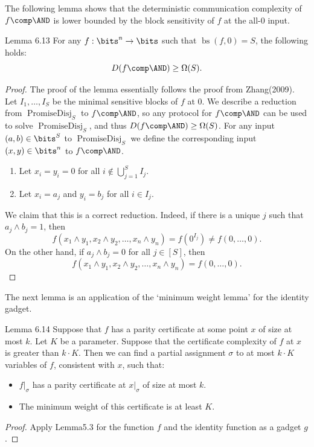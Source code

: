 The following lemma shows that the deterministic communication complexity of $f\comp\AND$ is lower bounded by the block sensitivity of $f$ at the all-0 input.
\begin{originalresult}{Lemma 6.13}
For any $f:\bits^n\to\bits$ such that $\operatorname{bs}(f,0)=S$, the following holds:
\[D(f\comp\AND)\ge\Omega(S).\]
\end{originalresult}
\begin{proof}
The proof of the lemma essentially follows the proof from Zhang(2009). Let $I_1,\ldots,I_S$ be the minimal sensitive blocks of $f$ at 0. We describe a reduction from $\operatorname{PromiseDisj}_S$ to $f\comp\AND$, so any protocol for $f\comp\AND$ can be used to solve $\operatorname{PromiseDisj}_S$, and thus $D(f\comp\AND)\ge\Omega(S)$. For any input $(a,b)\in\bits^S$ to $\operatorname{PromiseDisj}_S$ we define the corresponding input $(x,y)\in\bits^n$ to $f\comp\AND$.
\begin{enumerate}
\item Let $x_i=y_i=0$ for all $i\notin\bigcup_{j=1}^S I_j$.
\item Let $x_i=a_j$ and $y_i=b_j$ for all $i\in I_j$.
\end{enumerate}
We claim that this is a correct reduction. Indeed, if there is a unique $j$ such that $a_j\wedge b_j=1$, then
\[f(x_1\wedge y_1,x_2\wedge y_2,\ldots,x_n\wedge y_n)=f(0^{I_j})\ne f(0,\ldots,0).\]
On the other hand, if $a_j\wedge b_j=0$ for all $j\in[S]$, then
\[f(x_1\wedge y_1,x_2\wedge y_2,\ldots,x_n\wedge y_n)=f(0,\ldots,0).\]
\end{proof}
The next lemma is an application of the `minimum weight lemma' for the identity gadget.
\begin{originalresult}{Lemma 6.14}
Suppose that $f$ has a parity certificate at some point $x$ of size at most $k$. Let $K$ be a parameter. Suppose that the certificate complexity of $f$ at $x$ is greater than $k\cdot K$. Then we can find a partial assignment $\sigma$ to at most $k\cdot K$ variables of $f$, consistent with $x$, such that:
\begin{itemize}
\item $f|_\sigma$ has a parity certificate at $x|_\sigma$ of size at most $k$.
\item The minimum weight of this certificate is at least $K$.
\end{itemize}
\end{originalresult}
\begin{proof}
Apply Lemma5.3 for the function $f$ and the identity function as a gadget $g$.
\end{proof}
